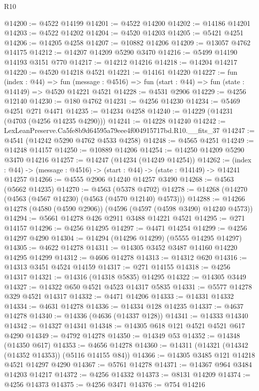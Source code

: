 \begin{lexlean}{R10}
\begin{coremodule}
@14200 := @4522 @14199
@14201 := @4522 @14200
@14202 := @14186 @14201
@14203 := @4522 @14202
@14204 := @4520 @14203
@14205 := @5421 @4251
@14206 := @14205 @4258
@14207 := @10882 @14206
@14209 := @13057 @4762 @14175
@14212 := @14207 @14209 @5290 @3470
@14216 := @5499 @14190 @14193 @3151 @770
@14217 := @14212 @14216
@14218 := @14204 @14217
@14220 := @4520 @14218 @4521
@14221 := @14161 @14220
@14227 := fun (index : @44) =>
  fun (message : @4516) => fun (start : @44) => fun (state : @14149) => @4520 @14221 @4521
@14228 := @4531 @2906
@14229 := @4256 @12140
@14230 := @180 @4762
@14231 := @4256 @14230
@14234 := @5469 @4251 @271 @4471
@14235 := @14234 @4258
@14240 := @14229 (@14231 (@4703 (@4256 @14235 @4290)))
@14241 := @14228 @14240
@14242 := LexLeanPreserve.Ca5fe8b9d64595a79eee4f004915717bd.R10.__fits_37
@14247 := @4541 (@14242 @5290 @4762 @4533 @4258)
@14248 := @4565 @4251
@14249 := @14248 @14157
@14250 := @10889 @14206
@14254 := @14250 @14209 @5290 @3470 @14216
@14257 := @14247 (@14234 (@14249 @14254))
@14262 := (index : @44) -> (message : @4516) -> (start : @44) -> (state : @14149) -> @14241 @14257
@14266 := @4555 @2906 @14240 @14257 @3490
@14268 := @4563 (@5662 @14235)
@14270 := @4563 (@5378 @4702)
@14278 := @14268 (@14270 (@4563 (@4567 @14230) (@4563 (@4570 @12140) @4573)))
@14288 := @14266 @14278 (@4580 (@4590 @2906)) (@4596 (@4597 (@4598 @3490) @14240 @4573))
@14294 := @5661 @14278 @426 @2911 @3488 @14221 @4521
@14295 := @271 @14157
@14296 := @4256 @14295
@14297 := @4471 @14254
@14299 := @4256 @14297 @4290
@14304 := @14294 (@14296 @14299) (@5555 @14295 @14297)
@14305 := @4622 @14278
@14311 := @14305 @3452 @3487 @14160 @14220 @14295 @14299
@14312 := @4606 @14278
@14313 := @14312 @620
@14316 := @14313 @3451 @4524 @14159
@14317 := @271 @14155
@14318 := @4256 @14317
@14321 := @14316 (@14318 @5835) @14295
@14322 := @14305 @3449
@14327 := @14322 @650 @4521 @4523 @14317 @5835
@14331 := @5577 @14278 @329 @4521 @14317
@14332 := @4471 @14206
@14333 := @14331 @14332
@14334 := @4631 @14278
@14336 := @14334 @128 @14235
@14337 := @4637 @14278
@14340 := @14336 (@4636 (@14337 @128))
@14341 := @14333 @14340
@14342 := @14327 @14341
@14348 := @14305 @618 @121 @4521 @4521 @617 @4290
@14349 := @4792 @14278
@14350 := @14349 @53
@14352 := @14348 (@14350 @617)
@14353 := @4656 @14278
@14360 := @14311 (@14321 (@14342 (@14352 @14353)) (@5116 @14155 @84))
@14366 := @14305 @3485 @121 @14218 @4521 @14297 @4290
@14367 := @5761 @14278
@14371 := @14367 @964 @3484 @14203 @14217
@14372 := @4256 @14332
@14373 := @8131 @14209
@14374 := @4256 @14373
@14375 := @4256 @3471
@14376 := @754 @14216

\end{coremodule}
\end{lexlean}
